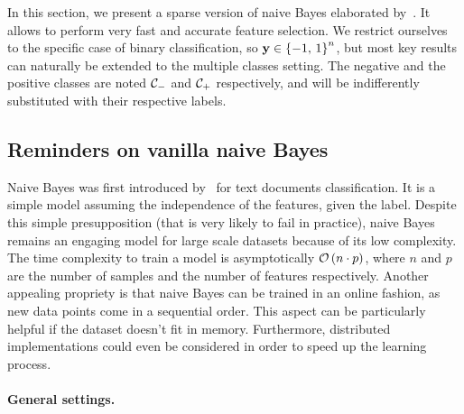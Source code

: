 In this section,
we present a sparse version of naive Bayes elaborated by~\cite{sparse_naive_bayes}.
It allows to perform very fast and accurate feature selection.
We restrict ourselves to the specific case of binary classification, so $\mathbf{y} \in \left\{ -1,\, 1 \right\}^n$,
but most key results can naturally be extended to the multiple classes setting.
The negative and the positive classes are noted $\mathcal{C}_-$ and $\mathcal{C}_+$ respectively,
and will be indifferently substituted with their respective labels.

\subsection{Reminders on vanilla naive Bayes}\label{subsec:naive_bayes}

Naive Bayes was first introduced by~\cite{original_naive_bayes} for text documents classification.
It is a simple model assuming the independence of the features, given the label.
Despite this simple presupposition (that is very likely to fail in practice),
naive Bayes remains an engaging model for large scale datasets because of its low complexity.
The time complexity to train a model is asymptotically $\mathcal{O}\left( n \cdot p \right)$,
where $n$ and $p$ are the number of samples and the number of features respectively.
Another appealing propriety is that naive Bayes can be trained in an online fashion,
as new data points come in a sequential order.
This aspect can be particularly helpful if the dataset doesn't fit in memory.
Furthermore, distributed implementations could even be considered in order to speed up the learning process.

\paragraph{General settings.}\label{subsubsec:nb_general}

